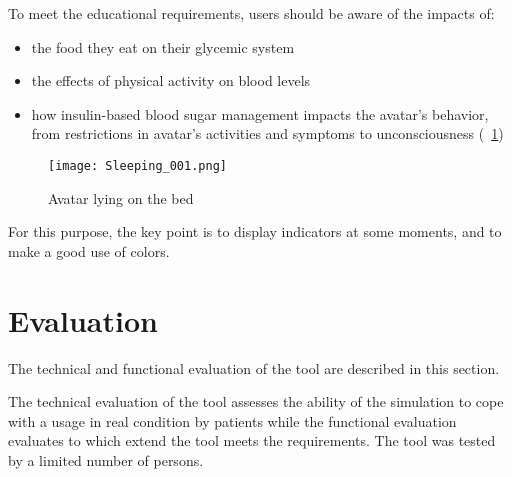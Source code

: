
To meet the educational requirements, users should be aware of the impacts of:
\begin{itemize}
\item the food they eat on their glycemic system
\item the effects of physical activity on blood levels
\item how insulin-based blood sugar management impacts the avatar's behavior, from restrictions in avatar's activities and symptoms to unconsciousness (~\ref{fig:unc})
\end{itemize}

\begin{figure}[h]
  \caption{Avatar lying on the bed}
  \centering
  \texttt{[image: Sleeping\_001.png]}
  \label{fig:unc}
\end{figure}

For this purpose, the key point is to display indicators at some moments, and to make a good use of colors.%










\section{Evaluation}

The technical and functional evaluation of the tool are described in this section. 

The technical evaluation of the tool assesses the ability of the simulation to cope with a usage in real condition by patients
while the functional evaluation evaluates to which extend the tool meets the requirements.
The tool was tested by a limited number of persons. %

